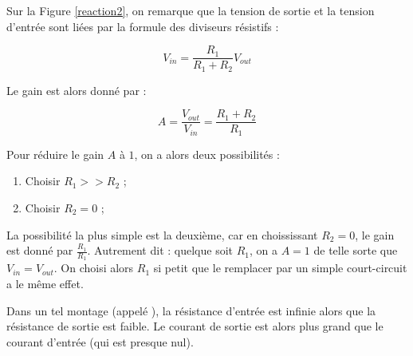 Sur la Figure \ref{reaction2}, on remarque que la tension de sortie et la tension d'entrée sont liées par la formule des diviseurs résistifs :

$$V_{in} = \frac{R_1}{R_1 + R_2} V_{out}$$

Le gain est alors donné par :

$$A = \frac{V_{out}}{V_{in}} = \frac{R_1 + R_2}{R_1}$$

Pour réduire le gain $A$ à $1$, on a alors deux possibilités :

\begin{enumerate}
	\item	Choisir $R_1 >> R_2$ ;
	\item Choisir $R_2 = 0$ ;
\end{enumerate}

La possibilité la plus simple est la deuxième, car en choississant $R_2 = 0$, le gain est donné par $\frac{R_1}{R_1}$. Autrement dit : quelque soit $R_1$, on a $A = 1$ de telle sorte que $V_{in} = V_{out}$. On choisi alors $R_1$ si petit que le remplacer par un simple court-circuit a le même effet.

Dans un tel montage (appelé ), la résistance d'entrée est infinie alors que la résistance de sortie est faible. Le courant de sortie est alors plus grand que le courant d'entrée (qui est presque nul).

\nocite{*} 



